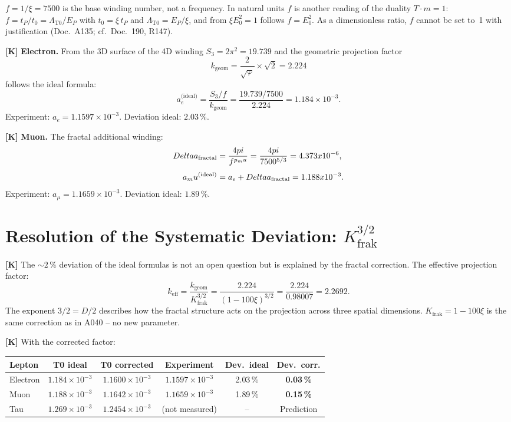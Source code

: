 $f = 1/\xi = 7500$ is the base winding number, not a frequency. In natural units $f$ is another reading of the duality $T\cdot m = 1$: $f = t_P/t_0 = \Lambda_{\text{T0}}/E_P$ with $t_0 = \xi\,t_P$ and $\Lambda_{\text{T0}} = E_P/\xi$, and from $\xi E_0^2 = 1$ follows $f = E_0^2$. As a dimensionless ratio, $f$ cannot be set to~1 with justification (Doc.~A135; cf.\ Doc.~190, R147).

\textbf{[K]} \textbf{Electron.} From the 3D surface of the 4D winding
$S_3=2\pi^2=19{.}739$ and the geometric projection factor
\[
  k_\text{geom} = \frac{2}{\sqrt\varphi}\times\sqrt2 = 2{.}224
\]
follows the ideal formula:
\[
  a_e^\text{(ideal)} = \frac{S_3/f}{k_\text{geom}}
  = \frac{19{.}739/7500}{2{.}224} = 1{.}184\times10^{-3}.
\]
Experiment: $a_e=1{.}1597\times10^{-3}$. Deviation ideal: $2{.}03\,\%$.

\textbf{[K]} \textbf{Muon.} The fractal additional winding:
\begin{align}
  \Delta a_\text{fractal} &= \frac{4\pi}{f^{p_\mu}} = \frac{4\pi}{7500^{5/3}}
  = 4{.}373\times10^{-6}, \notag\\[4pt]
  a_\mu^\text{(ideal)} &= a_e + \Delta a_\text{fractal} = 1{.}188\times10^{-3}. \notag
\end{align}
Experiment: $a_\mu=1{.}1659\times10^{-3}$. Deviation ideal: $1{.}89\,\%$.

\section{Resolution of the Systematic Deviation: \texorpdfstring{$K_\text{frak}^{3/2}$}{K\_frak\textasciicircum 3/2}}

\textbf{[K]} The $\sim2\,\%$ deviation of the ideal formulas is not an open
question but is explained by the fractal correction. The effective projection
factor:
\[
  k_\text{eff}
  = \frac{k_\text{geom}}{K_\text{frak}^{3/2}}
  = \frac{2{.}224}{(1-100\xi)^{3/2}}
  = \frac{2{.}224}{0{.}98007}
  = 2{.}2692.
\]
The exponent $3/2=D/2$ describes how the fractal structure acts on the projection
across three spatial dimensions. $K_\text{frak}=1-100\xi$ is the same correction
as in A040 -- no new parameter.

\textbf{[K]} With the corrected factor:

\begin{center}
\renewcommand{\arraystretch}{1.3}
{\small
\begin{tabular}{lccccc}
\toprule
Lepton & T0 ideal & T0 corrected & Experiment & Dev.\ ideal & Dev.\ corr. \\
\midrule
Electron & $1{.}184\times10^{-3}$ & $1{.}1600\times10^{-3}$ & $1{.}1597\times10^{-3}$ & 2{.}03\,\% & \textbf{0{.}03\,\%} \\
Muon     & $1{.}188\times10^{-3}$ & $1{.}1642\times10^{-3}$ & $1{.}1659\times10^{-3}$ & 1{.}89\,\% & \textbf{0{.}15\,\%} \\
Tau      & $1{.}269\times10^{-3}$ & $1{.}2454\times10^{-3}$ & (not measured)          & --         & Prediction \\
\bottomrule
\end{tabular}
}
\renewcommand{\arraystretch}{1.0}
\end{center}


